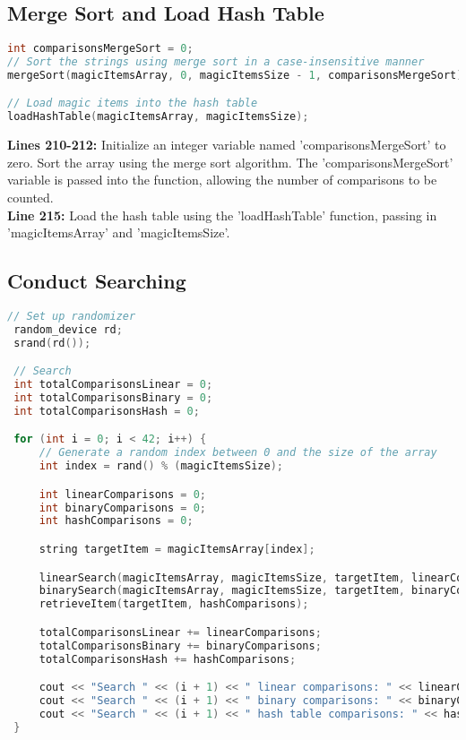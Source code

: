 \documentclass[letterpaper, 10pt,DIV=13]{scrartcl}
\numberwithin{equation}{section} %
\numberwithin{figure}{section} %
\numberwithin{table}{section} %
\begin{document}
\subsection{Merge Sort and Load Hash Table}
\begin{linenumbers}
\begin{lstlisting}[language=C++, caption={Merge Sort and Load Hash Table}, label={code:example}]
int comparisonsMergeSort = 0;
// Sort the strings using merge sort in a case-insensitive manner
mergeSort(magicItemsArray, 0, magicItemsSize - 1, comparisonsMergeSort);

// Load magic items into the hash table
loadHashTable(magicItemsArray, magicItemsSize);
\end{lstlisting}
\end{linenumbers}
\nolinenumbers

\textbf{Lines 210-212:} Initialize an integer variable named 'comparisonsMergeSort' to zero. Sort the array using the merge sort algorithm. The 'comparisonsMergeSort' variable is passed into the function, allowing the number of comparisons to be counted. \\
\textbf{Line 215:} Load the hash table using the 'loadHashTable' function, passing in 'magicItemsArray' and 'magicItemsSize'.

\subsection{Conduct Searching}
\begin{linenumbers}
\begin{lstlisting}[language=C++, caption={Conduct Searching}, label={code:example}]
 // Set up randomizer
 random_device rd;
 srand(rd());

 // Search
 int totalComparisonsLinear = 0;
 int totalComparisonsBinary = 0;
 int totalComparisonsHash = 0;

 for (int i = 0; i < 42; i++) {
     // Generate a random index between 0 and the size of the array
     int index = rand() % (magicItemsSize);

     int linearComparisons = 0;
     int binaryComparisons = 0;
     int hashComparisons = 0;

     string targetItem = magicItemsArray[index]; 

     linearSearch(magicItemsArray, magicItemsSize, targetItem, linearComparisons);
     binarySearch(magicItemsArray, magicItemsSize, targetItem, binaryComparisons);
     retrieveItem(targetItem, hashComparisons);

     totalComparisonsLinear += linearComparisons;
     totalComparisonsBinary += binaryComparisons;
     totalComparisonsHash += hashComparisons;

     cout << "Search " << (i + 1) << " linear comparisons: " << linearComparisons << endl;
     cout << "Search " << (i + 1) << " binary comparisons: " << binaryComparisons << endl;
     cout << "Search " << (i + 1) << " hash table comparisons: " << hashComparisons << "\n" << endl;
 }
\end{lstlisting}
\end{linenumbers}
\nolinenumbers
\end{document}
